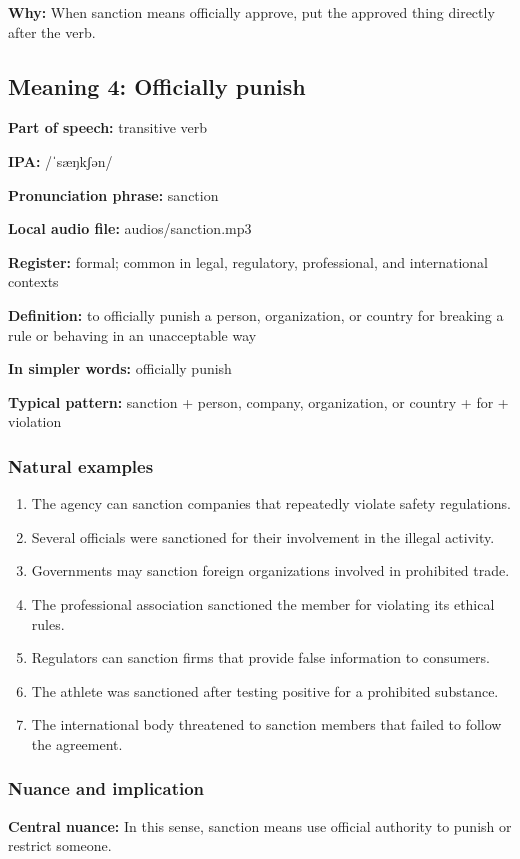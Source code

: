 \documentclass[11pt]{article}
\begin{document}
\textbf{Why:} When sanction means officially approve, put the approved thing directly after the verb.

\subsection{Meaning 4: Officially punish}
\textbf{Part of speech:} transitive verb

\textbf{IPA:} /ˈsæŋkʃən/

\textbf{Pronunciation phrase:} sanction

\textbf{Local audio file:} audios/sanction.mp3

\textbf{Register:} formal; common in legal, regulatory, professional, and international contexts

\textbf{Definition:} to officially punish a person, organization, or country for breaking a rule or behaving in an unacceptable way

\textbf{In simpler words:} officially punish

\textbf{Typical pattern:} sanction + person, company, organization, or country + for + violation

\subsubsection{Natural examples}
\begin{enumerate}
  \item The agency can sanction companies that repeatedly violate safety regulations.
  \item Several officials were sanctioned for their involvement in the illegal activity.
  \item Governments may sanction foreign organizations involved in prohibited trade.
  \item The professional association sanctioned the member for violating its ethical rules.
  \item Regulators can sanction firms that provide false information to consumers.
  \item The athlete was sanctioned after testing positive for a prohibited substance.
  \item The international body threatened to sanction members that failed to follow the agreement.
\end{enumerate}

\subsubsection{Nuance and implication}
\textbf{Central nuance:} In this sense, sanction means use official authority to punish or restrict someone.
\end{document}
